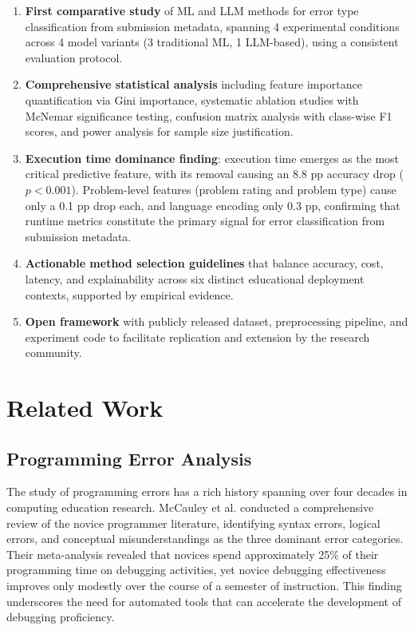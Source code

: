 \documentclass[10pt,a4paper]{article}
\begin{document}
\begin{enumerate}
    \item \textbf{First comparative study} of ML and LLM methods for error
          type classification from submission metadata, spanning 4
          experimental conditions across 4 model variants (3 traditional ML,
          1 LLM-based), using a consistent evaluation protocol.
    \item \textbf{Comprehensive statistical analysis} including feature
          importance quantification via Gini importance, systematic ablation
          studies with McNemar significance testing, confusion matrix analysis
          with class-wise F1 scores, and power analysis for sample size
          justification.
    \item \textbf{Execution time dominance finding}: execution time emerges as
          the most critical predictive feature, with its removal causing an 8.8 pp
          accuracy drop ($p < 0.001$). Problem-level features (problem rating and
          problem type) cause only a 0.1 pp drop each, and language encoding only
          0.3 pp, confirming that runtime metrics constitute the primary signal for error classification
          from submission metadata.
    \item \textbf{Actionable method selection guidelines} that balance
          accuracy, cost, latency, and explainability across six distinct
          educational deployment contexts, supported by empirical evidence.
    \item \textbf{Open framework} with publicly released dataset, preprocessing
          pipeline, and experiment code to facilitate replication and
          extension by the research community.
\end{enumerate}

\section{Related Work}


\subsection{Programming Error Analysis}

The study of programming errors has a rich history spanning over four decades
in computing education research. McCauley et al. \cite{mccauley2008evidence}
conducted a comprehensive review of the novice programmer literature, identifying
syntax errors, logical errors, and conceptual misunderstandings as the three
dominant error categories. Their meta-analysis revealed that novices spend
approximately 25\% of their programming time on debugging activities, yet
novice debugging effectiveness improves only modestly over the course of a semester
of instruction. This finding underscores the need for automated tools that can
accelerate the development of debugging proficiency.
\end{document}
